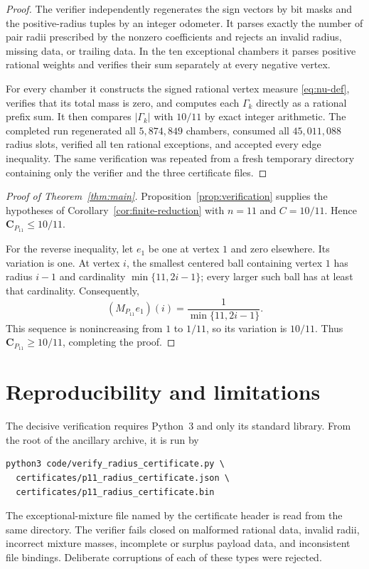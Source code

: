 \documentclass[11pt]{amsart}
\theoremstyle{definition}
\newcommand{\Cpath}[1]{\mathbf C_{P_{#1}}}
\begin{document}
\begin{proof}
The verifier independently regenerates the sign vectors by bit masks and the
positive-radius tuples by an integer odometer.  It parses exactly the number
of pair radii prescribed by the nonzero coefficients and rejects an invalid
radius, missing data, or trailing data.  In the ten exceptional chambers it
parses positive rational weights and verifies their sum separately at every
negative vertex.

For every chamber it constructs the signed rational vertex measure
\eqref{eq:nu-def}, verifies that its total mass is zero, and computes each
$\Gamma_k$ directly as a rational prefix sum.  It then compares
$|\Gamma_k|$ with $10/11$ by exact integer arithmetic.  The completed run
regenerated all $5{,}874{,}849$ chambers, consumed all
$45{,}011{,}088$ radius slots, verified all ten rational exceptions, and
accepted every edge inequality.  The same verification was repeated from a
fresh temporary directory containing only the verifier and the three
certificate files.
\end{proof}

\begin{proof}[Proof of Theorem~\ref{thm:main}]
Proposition~\ref{prop:verification} supplies the hypotheses of
Corollary~\ref{cor:finite-reduction} with $n=11$ and $C=10/11$.  Hence
$\Cpath{11}\leq10/11$.

For the reverse inequality, let $e_1$ be one at vertex $1$ and zero
elsewhere.  Its variation is one.  At vertex $i$, the smallest centered ball
containing vertex $1$ has radius $i-1$ and cardinality
$\min\{11,2i-1\}$; every larger such ball has at least that cardinality.
Consequently,
\[
  (M_{P_{11}}e_1)(i)=\frac1{\min\{11,2i-1\}}.
\]
This sequence is nonincreasing from $1$ to $1/11$, so its variation is
$10/11$.  Thus $\Cpath{11}\geq10/11$, completing the proof.
\end{proof}

\section{Reproducibility and limitations}

The decisive verification requires Python~3 and only its standard library.
From the root of the ancillary archive, it is run by
\begin{verbatim}
python3 code/verify_radius_certificate.py \
  certificates/p11_radius_certificate.json \
  certificates/p11_radius_certificate.bin
\end{verbatim}
The exceptional-mixture file named by the certificate header is read from the
same directory.  The verifier fails closed on malformed rational data,
invalid radii, incorrect mixture masses, incomplete or surplus payload data,
and inconsistent file bindings.  Deliberate corruptions of each of these
types were rejected.
\end{document}
